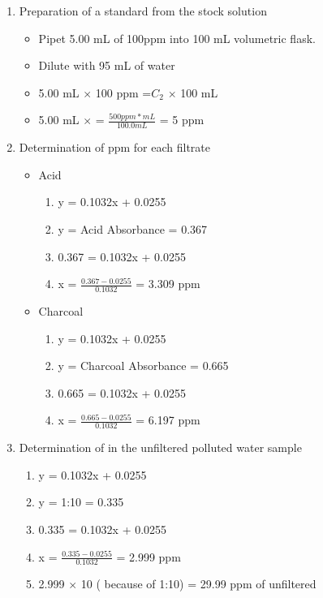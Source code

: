 \documentclass[10pt]{article}
\begin{document}
\begin{enumerate}[noitemsep]
    \item Preparation of a  standard from the stock solution
    \begin{itemize}
        \item Pipet 5.00 mL of 100ppm  into 100 mL volumetric flask.
        \item Dilute with 95 mL of water
        \item 5.00 mL $\times$ 100 ppm =$ C_2$ $\times$ 100 mL
        \item 5.00 mL $\times$ = $\frac{500 ppm*mL}{100.0 mL}$ = 5 ppm
    \end{itemize}
    \item Determination of  ppm for each filtrate
    \begin{itemize}
        \item Acid
        \begin{enumerate}
            \item y = 0.1032x + 0.0255
            \item y = Acid Absorbance = 0.367
            \item 0.367 = 0.1032x + 0.0255
            \item x = $\frac{0.367 - 0.0255}{0.1032}$ = 3.309 ppm
        \end{enumerate}
        \item Charcoal
        \begin{enumerate}
            \item y = 0.1032x + 0.0255
            \item y = Charcoal Absorbance = 0.665
            \item 0.665 = 0.1032x + 0.0255
            \item x = $\frac{0.665 - 0.0255}{0.1032}$ = 6.197 ppm
        \end{enumerate}
    \end{itemize}
    \item Determination of  in the unfiltered polluted water sample
    \begin{enumerate}
        \item y = 0.1032x + 0.0255
        \item y =  1:10 = 0.335
        \item 0.335 = 0.1032x + 0.0255
        \item x = $\frac{0.335 - 0.0255}{0.1032}$ = 2.999 ppm
        \item 2.999 $\times$ 10 ( because of 1:10) = 29.99 ppm of unfiltered 

\end{enumerate}
\end{enumerate}
\end{document}
